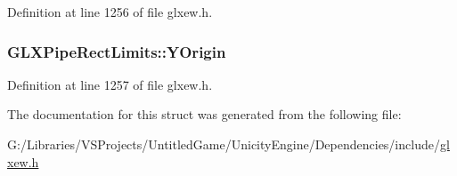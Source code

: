 Definition at line 1256 of file glxew.\+h.

\hypertarget{struct_g_l_x_pipe_rect_limits_a50e06bcf0dae95854be7d93a515199e9}{}
\subsubsection[{Y\+Origin}]{ G\+L\+X\+Pipe\+Rect\+Limits\+::\+Y\+Origin}\label{struct_g_l_x_pipe_rect_limits_a50e06bcf0dae95854be7d93a515199e9}


Definition at line 1257 of file glxew.\+h.



The documentation for this struct was generated from the following file\+:\begin{DoxyCompactItemize}
\item 
G\+:/\+Libraries/\+V\+S\+Projects/\+Untitled\+Game/\+Unicity\+Engine/\+Dependencies/include/\hyperlink{glxew_8h}{glxew.\+h}\end{DoxyCompactItemize}
